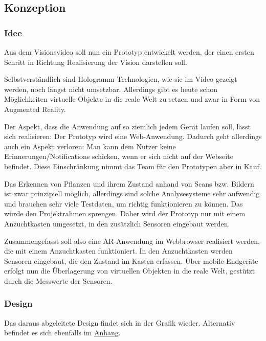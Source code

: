 \hypertarget{konzeption}{%
\subsection{Konzeption}\label{konzeption}}

\hypertarget{idee}{%
\subsubsection{Idee}\label{idee}}

Aus dem Visionsvideo soll nun ein Prototyp entwickelt werden, der einen
ersten Schritt in Richtung Realisierung der Vision darstellen soll.

Selbstverständlich sind Hologramm-Technologien, wie sie im Video gezeigt
werden, noch längst nicht umsetzbar. Allerdings gibt es heute schon
Möglichkeiten virtuelle Objekte in die reale Welt zu setzen und zwar in
Form von Augmented Reality.

Der Aspekt, dass die Anwendung auf so ziemlich jedem Gerät laufen soll,
lässt sich realisieren: Der Prototyp wird eine Web-Anwendung. Dadurch
geht allerdings auch ein Aspekt verloren: Man kann dem Nutzer keine
Erinnerungen/Notifications schicken, wenn er sich nicht auf der Webseite
befindet. Diese Einschränkung nimmt das Team für den Prototypen aber in
Kauf.

Das Erkennen von Pflanzen und ihrem Zustand anhand von Scans bzw.
Bildern ist zwar prinzipiell möglich, allerdings sind solche
Analysesysteme sehr aufwendig und brauchen sehr viele Testdaten, um
richtig funktionieren zu können. Das würde den Projektrahmen sprengen.
Daher wird der Prototyp nur mit einem Anzuchtkasten umgesetzt, in den
zusätzlich Sensoren eingebaut werden.

Zusammengefasst soll also eine AR-Anwendung im Webbrowser realisiert
werden, die mit einem Anzuchtkasten funktioniert. In den Anzuchtkasten
werden Sensoren eingebaut, die den Zustand im Kasten erfassen. Über
mobile Endgeräte erfolgt nun die Überlagerung von virtuellen Objekten in
die reale Welt, gestützt durch die Messwerte der Sensoren.

\hypertarget{design}{%
\subsubsection{Design}\label{design}}

Das daraus abgeleitete Design findet sich in der Grafik wieder.
Alternativ befindet es sich ebenfalls im
\protect\hyperlink{anhang}{Anhang}.


